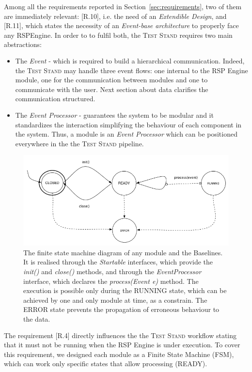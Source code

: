 Among all the requirements reported in Section~\ref{sec:requirements}, two of them are immediately relevant: [R.10], i.e. the need of an \textit{Extendible Design}, and [R.11], which states the necessity of an \textit{Event-base architecture} to properly face any RSPEngine. In order to to fulfil both, the \textsc{Test Stand} requires two main abstractions:
\begin{itemize}
\item The \textit{Event} - which is required to build a hierarchical communication. Indeed, the \textsc{Test Stand} may handle three event flows: one internal to the RSP Engine module, one for the communication between modules and one to communicate with the user. Next section about data clarifies the communication structured. 
\item The \textit{Event Processor} -  guarantees the system to be modular and it standardizes the interaction simplifying the behaviour of each component in the system. Thus, a module is an \textit{Event Processor} which can be positioned everywhere in the the \textsc{Test Stand} pipeline.
\end{itemize}

\begin{figure}[h!tb]
  \centering
	\includegraphics[width=\linewidth]{images/fsm-schema}
	\caption[\textit{EventProcessor} States Diagram]{The finite state machine diagram of any \name module and the Baselines. It is realised through the \textit{Startable} interfaces, which provide the \textit{init()} and \textit{close() }methods, and through the \textit{EventProcessor} interface, which declares the \textit{process(Event e)} method. The execution is possible only during the RUNNING state, which can be achieved by one and only module at time, as a constrain. The ERROR state prevents the propagation of erroneous behaviour to the data.}
  	\label{fig:module-fsm}
\end{figure}

\noindent The requirement [R.4] directly influences the  the \textsc{Test Stand} workflow stating that it must not be running when the RSP Engine is under execution. To cover this requirement, we designed each module as a Finite State Machine (FSM), which can work only specific states that allow processing (READY). 

